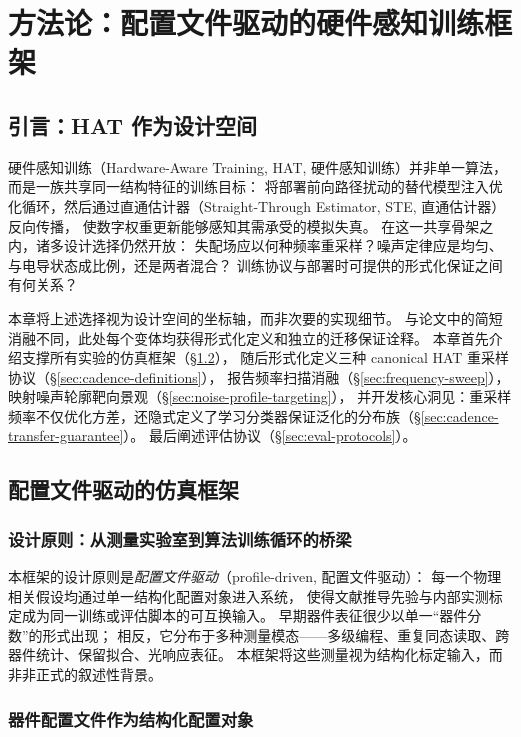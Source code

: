 \chapter{方法论：配置文件驱动的硬件感知训练框架}
\label{chap:methodology}

\section{引言：HAT 作为设计空间}

硬件感知训练（Hardware-Aware Training, HAT, 硬件感知训练）并非单一算法，而是一族共享同一结构特征的训练目标：
将部署前向路径扰动的替代模型注入优化循环，然后通过直通估计器（Straight-Through Estimator, STE, 直通估计器）反向传播，
使数字权重更新能够感知其需承受的模拟失真。
在这一共享骨架之内，诸多设计选择仍然开放：
失配场应以何种频率重采样？噪声定律应是均匀、与电导状态成比例，还是两者混合？
训练协议与部署时可提供的形式化保证之间有何关系？

本章将上述选择视为设计空间的坐标轴，而非次要的实现细节。
与论文中的简短消融不同，此处每个变体均获得形式化定义和独立的迁移保证诠释。
本章首先介绍支撑所有实验的仿真框架（\S\ref{sec:framework-overview}），
随后形式化定义三种 canonical HAT 重采样协议（\S\ref{sec:cadence-definitions}），
报告频率扫描消融（\S\ref{sec:frequency-sweep}），
映射噪声轮廓靶向景观（\S\ref{sec:noise-profile-targeting}），
并开发核心洞见：重采样频率不仅优化方差，还隐式定义了学习分类器保证泛化的分布族（\S\ref{sec:cadence-transfer-guarantee}）。
最后阐述评估协议（\S\ref{sec:eval-protocols}）。

\section{配置文件驱动的仿真框架}
\label{sec:framework-overview}

\subsection{设计原则：从测量实验室到算法训练循环的桥梁}

本框架的设计原则是\emph{配置文件驱动}（profile-driven, 配置文件驱动）：
每一个物理相关假设均通过单一结构化配置对象进入系统，
使得文献推导先验与内部实测标定成为同一训练或评估脚本的可互换输入。
早期器件表征很少以单一``器件分数''的形式出现；
相反，它分布于多种测量模态——多级编程、重复同态读取、跨器件统计、保留拟合、光响应表征。
本框架将这些测量视为结构化标定输入，而非非正式的叙述性背景。

\subsection{器件配置文件作为结构化配置对象}

